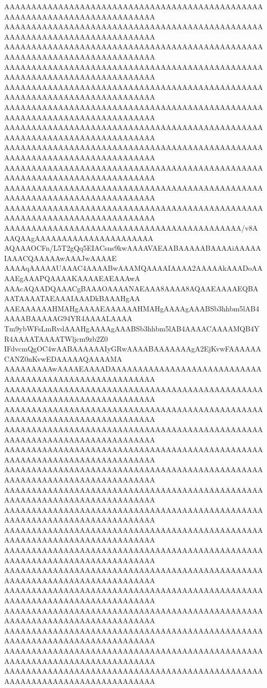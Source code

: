 AAAAAAAAAAAAAAAAAAAAAAAAAAAAAAAAAAAAAAAAAAAAAAAAAAAAAAAAAAAAAAAAAAAAAAAAAAAA
AAAAAAAAAAAAAAAAAAAAAAAAAAAAAAAAAAAAAAAAAAAAAAAAAAAAAAAAAAAAAAAAAAAAAAAAAAAA
AAAAAAAAAAAAAAAAAAAAAAAAAAAAAAAAAAAAAAAAAAAAAAAAAAAAAAAAAAAAAAAAAAAAAAAAAAAA
AAAAAAAAAAAAAAAAAAAAAAAAAAAAAAAAAAAAAAAAAAAAAAAAAAAAAAAAAAAAAAAAAAAAAAAAAAAA
AAAAAAAAAAAAAAAAAAAAAAAAAAAAAAAAAAAAAAAAAAAAAAAAAAAAAAAAAAAAAAAAAAAAAAAAAAAA
AAAAAAAAAAAAAAAAAAAAAAAAAAAAAAAAAAAAAAAAAAAAAAAAAAAAAAAAAAAAAAAAAAAAAAAAAAAA
AAAAAAAAAAAAAAAAAAAAAAAAAAAAAAAAAAAAAAAAAAAAAAAAAAAAAAAAAAAAAAAAAAAAAAAAAAAA
AAAAAAAAAAAAAAAAAAAAAAAAAAAAAAAAAAAAAAAAAAAAAAAAAAAAAAAAAAAAAAAAAAAAAAAAAAAA
AAAAAAAAAAAAAAAAAAAAAAAAAAAAAAAAAAAAAAAAAAAAAAAAAAAAAAAAAAAAAAAAAAAAAAAAAAAA
AAAAAAAAAAAAAAAAAAAAAAAAAAAAAAAAAAAAAAAAAAAAAAAAAAAAAAAAAAAAAAAAAAAAAAAAAAAA
AAAAAAAAAAAAAAAAAAAAAAAAAAAAAAAAAAAAAAAAAAAAAAAAAAAAAAAAAAAAAAAAAAAAAAAAAAAA
AAAAAAAAAAAAAAAAAAAAAAAAAAAAAAAAAAAAAAAAAAAA/v8AAAQAAgAAAAAAAAAAAAAAAAAAAAAA
AQAAAOCFn/L5T2gQq5EIACsns9kwAAAAVAEAABAAAAABAAAAiAAAAAIAAACQAAAAAwAAAJwAAAAE
AAAAqAAAAAUAAAC4AAAABwAAAMQAAAAIAAAA2AAAAAkAAADoAAAAEgAAAPQAAAAKAAAAEAEAAAwA
AAAcAQAADQAAACgBAAAOAAAANAEAAA8AAAA8AQAAEAAAAEQBAAATAAAATAEAAAIAAADkBAAAHgAA
AAEAAAAAAHMAHgAAAAEAAAAAAHMAHgAAAAgAAABSb3hhbm5lAB4AAAABAAAAAG94YR4AAAALAAAA
Tm9ybWFsLmRvdAAAHgAAAAgAAABSb3hhbm5lAB4AAAACAAAAMQB4YR4AAAATAAAATWljcm9zb2Z0
IFdvcmQgOC4wAABAAAAAAIyGRwAAAABAAAAAAAgA2EjKvwFAAAAAACANZ0nKvwEDAAAAAQAAAAMA
AAAAAAAAAwAAAAEAAAADAAAAAAAAAAAAAAAAAAAAAAAAAAAAAAAAAAAAAAAAAAAAAAAAAAAAAAAA
AAAAAAAAAAAAAAAAAAAAAAAAAAAAAAAAAAAAAAAAAAAAAAAAAAAAAAAAAAAAAAAAAAAAAAAAAAAA
AAAAAAAAAAAAAAAAAAAAAAAAAAAAAAAAAAAAAAAAAAAAAAAAAAAAAAAAAAAAAAAAAAAAAAAAAAAA
AAAAAAAAAAAAAAAAAAAAAAAAAAAAAAAAAAAAAAAAAAAAAAAAAAAAAAAAAAAAAAAAAAAAAAAAAAAA
AAAAAAAAAAAAAAAAAAAAAAAAAAAAAAAAAAAAAAAAAAAAAAAAAAAAAAAAAAAAAAAAAAAAAAAAAAAA
AAAAAAAAAAAAAAAAAAAAAAAAAAAAAAAAAAAAAAAAAAAAAAAAAAAAAAAAAAAAAAAAAAAAAAAAAAAA
AAAAAAAAAAAAAAAAAAAAAAAAAAAAAAAAAAAAAAAAAAAAAAAAAAAAAAAAAAAAAAAAAAAAAAAAAAAA
AAAAAAAAAAAAAAAAAAAAAAAAAAAAAAAAAAAAAAAAAAAAAAAAAAAAAAAAAAAAAAAAAAAAAAAAAAAA
AAAAAAAAAAAAAAAAAAAAAAAAAAAAAAAAAAAAAAAAAAAAAAAAAAAAAAAAAAAAAAAAAAAAAAAAAAAA
AAAAAAAAAAAAAAAAAAAAAAAAAAAAAAAAAAAAAAAAAAAAAAAAAAAAAAAAAAAAAAAAAAAAAAAAAAAA
AAAAAAAAAAAAAAAAAAAAAAAAAAAAAAAAAAAAAAAAAAAAAAAAAAAAAAAAAAAAAAAAAAAAAAAAAAAA
AAAAAAAAAAAAAAAAAAAAAAAAAAAAAAAAAAAAAAAAAAAAAAAAAAAAAAAAAAAAAAAAAAAAAAAAAAAA
AAAAAAAAAAAAAAAAAAAAAAAAAAAAAAAAAAAAAAAAAAAAAAAAAAAAAAAAAAAAAAAAAAAAAAAAAAAA
AAAAAAAAAAAAAAAAAAAAAAAAAAAAAAAAAAAAAAAAAAAAAAAAAAAAAAAAAAAAAAAAAAAAAAAAAAAA
AAAAAAAAAAAAAAAAAAAAAAAAAAAAAAAAAAAAAAAAAAAAAAAAAAAAAAAAAAAAAAAAAAAAAAAAAAAA
AAAAAAAAAAAAAAAAAAAAAAAAAAAAAAAAAAAAAAAAAAAAAAAAAAAAAAAAAAAAAAAAAAAAAAAAAAAA
